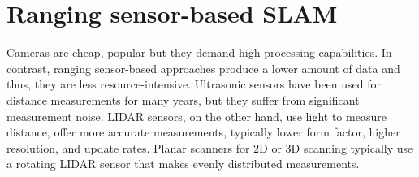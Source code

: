 \documentclass[conference]{IEEEtran}
\begin{document}
%






\section{Ranging sensor-based SLAM}
Cameras are cheap, popular but they demand high processing capabilities. In contrast, ranging sensor-based 
approaches produce a lower amount of data and thus, they are less resource-intensive. Ultrasonic sensors have been used for distance measurements for many years, but they suffer from significant 
measurement noise. LIDAR sensors, on the other hand, use light to measure distance, offer more accurate 
measurements, typically lower form factor, higher resolution, and update rates. Planar scanners for 2D or 3D 
scanning typically use a rotating LIDAR sensor that makes evenly distributed measurements.
\end{document}
